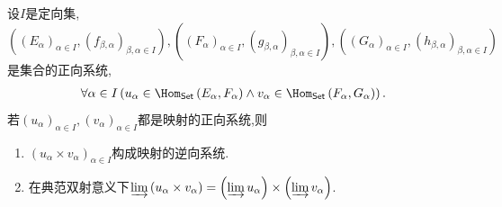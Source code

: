 \begin{corollary}{}{}
	设$I$是定向集,$\left(\left(E_{\alpha}\right)_{\alpha\in I},\left(f_{\beta,\alpha}\right)_{\beta,\alpha\in I}\right),\left(\left(F_{\alpha}\right)_{\alpha\in I},\left(g_{\beta,\alpha}\right)_{\beta,\alpha\in I}\right),\left(\left(G_{\alpha}\right)_{\alpha\in I},\left(h_{\beta,\alpha}\right)_{\beta,\alpha\in I}\right)$是集合的正向系统,
	\begin{align*}
		\forall\alpha\in I\left(u_{\alpha}\in\Hom_{\mathsf{Set}}\left(E_{\alpha},F_{\alpha}\right)\wedge v_{\alpha}\in\Hom_{\mathsf{Set}}\left(F_{\alpha},G_{\alpha}\right)\right).
	\end{align*}
	若$\left(u_{\alpha}\right)_{\alpha\in I},\left(v_{\alpha}\right)_{\alpha\in I}$都是映射的正向系统,则
	\begin{enumerate}
		\item $\left(u_{\alpha}\times v_{\alpha}\right)_{\alpha\in I}$构成映射的逆向系统.
		\item 在典范双射意义下$\varinjlim\left(u_{\alpha}\times v_{\alpha}\right)=\left(\varinjlim u_{\alpha}\right)\times\left(\varinjlim v_{\alpha}\right)$.
	\end{enumerate}
\end{corollary}

